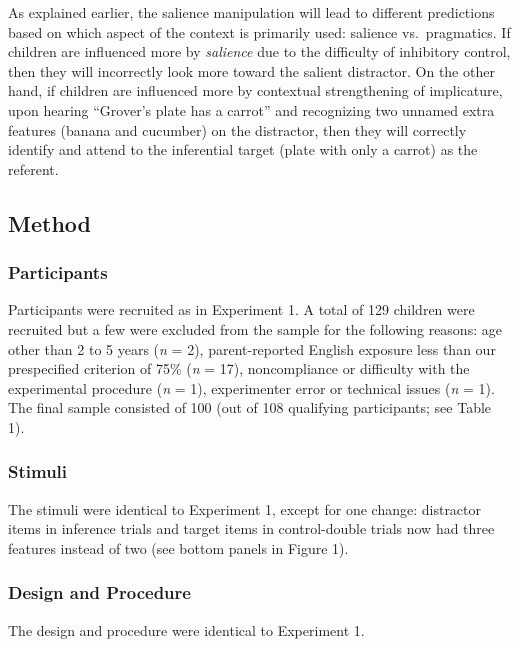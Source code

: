 \documentclass[a4paper,man,apacite,floatsintext]{apa6}
\begin{document}
As explained earlier, the salience manipulation will lead to different
predictions based on which aspect of the context is primarily used:
salience vs.~pragmatics. If children are influenced more by
\emph{salience} due to the difficulty of inhibitory control, then they
will incorrectly look more toward the salient distractor. On the other
hand, if children are influenced more by contextual strengthening of
implicature, upon hearing ``Grover's plate has a carrot'' and
recognizing two unnamed extra features (banana and cucumber) on the
distractor, then they will correctly identify and attend to the
inferential target (plate with only a carrot) as the referent.

\subsection{Method}\label{method-1}

\subsubsection{Participants}\label{participants-1}

Participants were recruited as in Experiment 1. A total of 129 children
were recruited but a few were excluded from the sample for the following
reasons: age other than 2 to 5 years (\emph{n} = 2), parent-reported
English exposure less than our prespecified criterion of 75\% (\emph{n}
= 17), noncompliance or difficulty with the experimental procedure
(\emph{n} = 1), experimenter error or technical issues (\emph{n} = 1).
The final sample consisted of 100 (out of 108 qualifying participants;
see Table 1).

\subsubsection{Stimuli}\label{stimuli}

The stimuli were identical to Experiment 1, except for one change:
distractor items in inference trials and target items in control-double
trials now had three features instead of two (see bottom panels in
Figure 1).

\subsubsection{Design and Procedure}\label{design-and-procedure}

The design and procedure were identical to Experiment 1.
\end{document}
